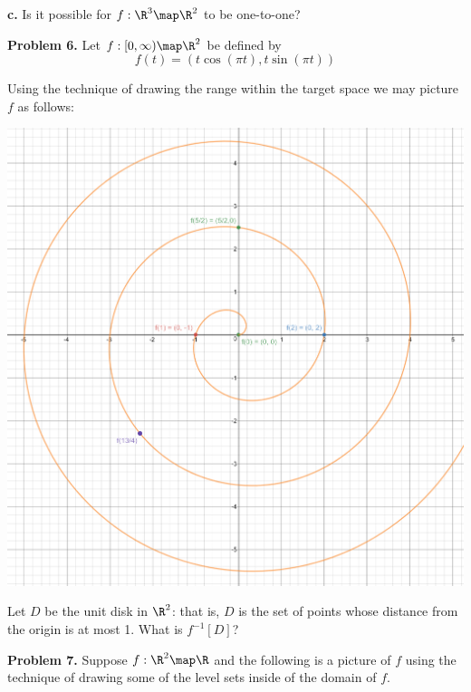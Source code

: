 \documentclass[oneside,12pt]{amsart}
\begin{document}
\bigskip

\textbf{c.} Is it possible for $f:\R^3\map\R^2$ to be one-to-one?

\bigskip

\textbf{Problem 6.} Let $f:[0, \infty)\map \R^2$ be defined by
$$f(t) = (t \cos(\pi t), t \sin(\pi t))$$

Using the technique of drawing the range within the target space we may picture
$f$ as follows:

\includegraphics[scale=0.2]{spiral}

Let $D$ be the unit disk in $\R^2$: that is, $D$ is the set of points whose
distance from the origin is at most 1. What is $f^{-1}[D]$?

\bigskip

\textbf{Problem 7.} Suppose $f:\R^2\map\R$ and the following is a picture
of $f$ using the technique of drawing some of the level sets inside of the
domain of $f$.
\end{document}
